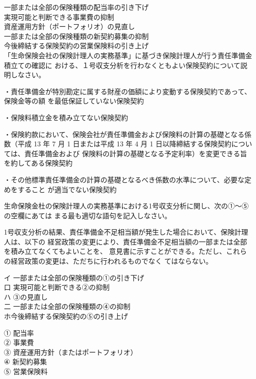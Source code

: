 \documentclass[report,gutter=10mm,fore-edge=10mm,uplatex,dvipdfmx]{jlreq}
\begin{document}
\answer{}
一部または全部の保険種類の配当率の引き下げ\\
実現可能と判断できる事業費の抑制\\
資産運用方針（ポートフォリオ）の見直し\\
一部または全部の保険種類の新契約募集の抑制\\
今後締結する保険契約の営業保険料の引き上げ\\

「生命保険会社の保険計理人の実務基準」に基づき保険計理人が行う責任準備金積立ての確認に
おける、１号収支分析を行わなくともよい保険契約について説明しなさい。

\answer{}

・責任準備金が特別勘定に属する財産の価額により変動する保険契約であって、保険金等の額
を最低保証していない保険契約

・保険料積立金を積み立てない保険契約

・保険約款において、保険会社が責任準備金および保険料の計算の基礎となる係数（平成 13
年 7 月 1 日または平成 13 年 4 月 1 日以降締結する保険契約については、責任準備金および
保険料の計算の基礎となる予定利率）を変更できる旨を約してある保険契約

・その他標準責任準備金の計算の基礎となるべき係数の水準について、必要な定めをすること
が適当でない保険契約

生命保険金杜の保険計理人の実務基準における1号収支分析に関し、次の①〜⑤の空欄にあては
まる最も適切な語句を記入しなさい。

1号収支分析の結果、責任準備金不足相当額が発生した場合において、保険計理人は、以下の
経営政策の変更により、責任準備金不足相当額の一部または全部を積み立てなくてもよいことを、
意見書に示すことができる。ただし、これらの経営政策の変更は、ただちに行われるものでなく
てはならない。

イ 一部または全部の保険種類の①の引き下げ\\
口 実現可能と判断できる②の抑制\\
ハ ③の見直し\\
二 一部または全部の保険種類の④の抑制\\
ホ今後締結する保険契約の⑤の引き上げ\\

\answer{}

① 配当率\\
② 事業費 \\
③ 資産運用方針（またはポートフォリオ） \\
④ 新契約募集 \\
⑤ 営業保険料 \\
\end{document}
